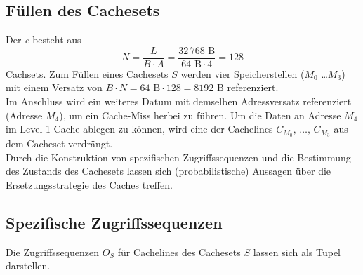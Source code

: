 \documentclass[]{scrbook}
\begin{document}
\subsection{Füllen des Cachesets}

Der \textsl{\gls{c}} besteht aus 
\begin{equation}
N = \frac{L}{B \cdot A} = \frac{32\,768 \textrm{ B}}{64 \textrm{ B} \cdot 4} = 128
\end{equation}
Cachsets.
Zum Füllen eines Cachesets $S$ werden vier Speicherstellen ($M_{0}$ \dots $M_{3}$) mit einem Versatz von $B\cdot N = 64 \textrm{ B} \cdot128 = 8192 \textrm{ B}$ referenziert.
\\
Im Anschluss wird ein weiteres Datum mit demselben Adressversatz referenziert (Adresse $M_{4}$), um ein Cache-Miss herbei zu führen.
Um die Daten an Adresse $M_{4}$ im Level-1-Cache ablegen zu können, wird eine der Cachelines $C_{M_0},\,\dots,\,C_{M_3}$ aus dem Cacheset verdrängt. 
\\
Durch die Konstruktion von spezifischen Zugriffssequenzen und die Bestimmung des Zustands des Cachesets lassen sich (probabilistische) Aussagen über die Ersetzungsstrategie des Caches treffen.



\subsection{Spezifische Zugriffssequenzen} \label{seq}

Die Zugriffssequenzen $O_S$ für Cachelines des Cachesets $S$ lassen sich als Tupel darstellen.
\end{document}
